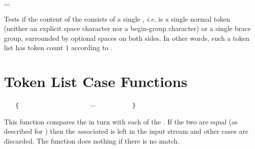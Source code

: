 \documentclass[oneside]{book}
\begin{document}
\begin{function}{\TlVarIfSingle,\TlVarIfSingleT,\TlVarIfSingleF,\TlVarIfSingleTF}
\begin{syntax}
 
  
  
   
\end{syntax}
Tests if the content of the  consists of a single ,
\emph{i.e.} is a single normal token (neither an explicit space
character nor a begin-group character) or a single brace group,
surrounded by optional spaces on both sides. In other words, such a
token list has token count $1$ according to .
\begin{demohigh}
\TlSet {}
\TlVarIfSingleTF {} {}
\TlSet {}
\TlVarIfSingleTF {} {}
\end{demohigh}
\end{function}

\section{Token List Case Functions}

\begin{function}{\TlVarCase}
\begin{syntax}
 
~ ~ \verb"{"
~ ~ ~ ~  
~ ~ ~ ~  
~ ~ ~ ~ $\cdots$
~ ~ ~ ~  
~ ~ \verb"}"
\end{syntax}
This function compares the  in turn
with each of the . If the two
are equal (as described for )
then the associated  is left in the input
stream and other cases are discarded. The function
does nothing if there is no match.
\begin{demohigh}
\IgnoreSpacesOn
\TlSet {}
\TlSet {}
\TlSet {}
\TlSet {}
\TlVarCase {}
\IgnoreSpacesOff
\end{demohigh}
\end{function}
\end{document}
